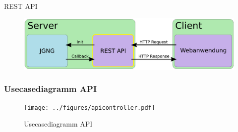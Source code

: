 \begin{frame}
    \begin{center}
        \Huge{REST API}
    \end{center}
    \begin{figure}[h]
        \centering
        \includegraphics[width=\textwidth]{bilder/client-server_rest-active.pdf}
    \end{figure}
\end{frame}
\subsubsection*{Usecasediagramm API}
\begin{frame}
    \begin{figure}[h]
        \centering
        \texttt{[image: ../figures/apicontroller.pdf]}
        \caption{Usecasediagramm API}
    \end{figure}
\end{frame}
